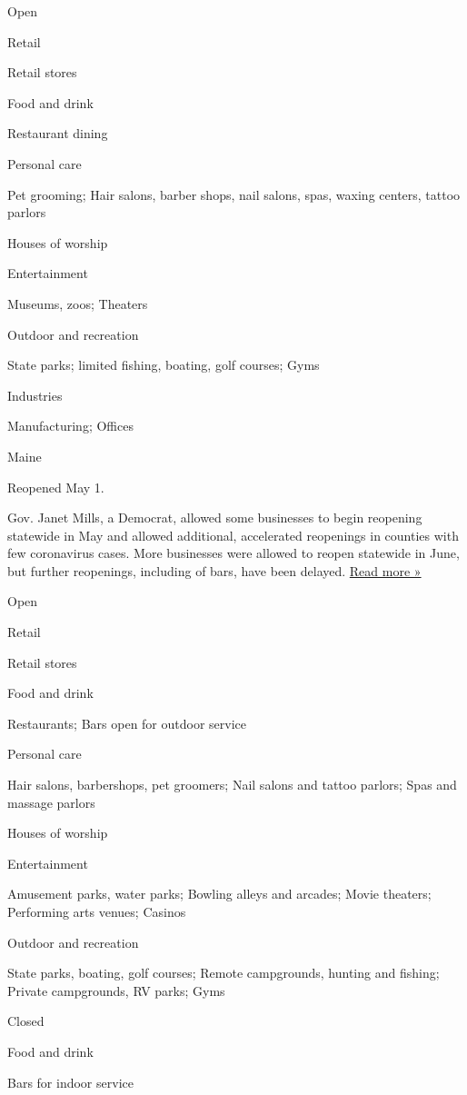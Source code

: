 Open

Retail

Retail stores

Food and drink

Restaurant dining

Personal care

Pet grooming; Hair salons, barber shops, nail salons, spas, waxing
centers, tattoo parlors

Houses of worship

Entertainment

Museums, zoos; Theaters

Outdoor and recreation

State parks; limited fishing, boating, golf courses; Gyms

Industries

Manufacturing; Offices

Maine

Reopened May 1.

Gov. Janet Mills, a Democrat, allowed some businesses to begin reopening
statewide in May and allowed additional, accelerated reopenings in
counties with few coronavirus cases. More businesses were allowed to
reopen statewide in June, but further reopenings, including of bars,
have been delayed.
\href{https://bangordailynews.com/2020/06/22/business/janet-mills-postpones-reopening-indoor-bar-service-citing-infections-in-other-states/}{Read
more »}

Open

Retail

Retail stores

Food and drink

Restaurants; Bars open for outdoor service

Personal care

Hair salons, barbershops, pet groomers; Nail salons and tattoo parlors;
Spas and massage parlors

Houses of worship

Entertainment

Amusement parks, water parks; Bowling alleys and arcades; Movie
theaters; Performing arts venues; Casinos

Outdoor and recreation

State parks, boating, golf courses; Remote campgrounds, hunting and
fishing; Private campgrounds, RV parks; Gyms

Closed

Food and drink

Bars for indoor service

